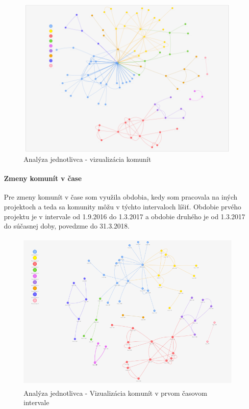 \documentclass[slovak,master,public,dept460,male,cpdeclaration,oneside]{diploma}
\begin{document}
\begin{figure}[H]
\centering
\includegraphics[width=12cm, height=8cm]{figures/analyza_jednotlivca_komunity}
\caption{Analýza jednotlivca - vizualizácia komunít}
\label{analyza_jednotlivca_stat}
\end{figure}


\paragraph{Zmeny komunít v čase}
\hfill \break
Pre zmeny komunít v čase som využila obdobia, kedy som pracovala na iných projektoch a teda sa komunity môžu v týchto intervaloch líšiť. Obdobie prvého projektu je v intervale od 1.9.2016 do 1.3.2017 a obdobie druhého je od 1.3.2017 do súčasnej doby, povedzme do 31.3.2018. 


\begin{figure}[H]
\centering
\includegraphics[width=12cm, height=8cm]{figures/analyza_jednotlivca_komunity_firstInt}
\caption{Analýza jednotlivca - Vizualizácia komunít v prvom časovom intervale}
\label{analyza_jednotlivca_komunity_firstInt}
\end{figure}
\end{document}
